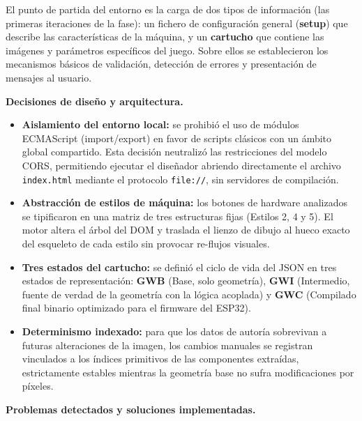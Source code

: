 El punto de partida del entorno es la carga de dos tipos de información
(las primeras iteraciones de la fase): un fichero de configuración
general (\textbf{setup}) que describe las características de la máquina,
y un \textbf{cartucho} que contiene las imágenes y parámetros
específicos del juego. Sobre ellos se establecieron los mecanismos
básicos de validación, detección de errores y presentación de mensajes
al usuario.

\textbf{Decisiones de diseño y arquitectura.}

\begin{itemize}
	\item \textbf{Aislamiento del entorno local:} se prohibió el uso de
	módulos ECMAScript (import/export) en favor de scripts clásicos con un
	ámbito global compartido. Esta decisión neutralizó las restricciones
	del modelo CORS, permitiendo ejecutar el diseñador abriendo
	directamente el archivo \texttt{index.html} mediante el protocolo
	\texttt{file://}, sin servidores de compilación.
	\item \textbf{Abstracción de estilos de máquina:} los botones de
	hardware analizados se tipificaron en una matriz de tres estructuras
	fijas (Estilos 2, 4 y 5). El motor altera el árbol del DOM y traslada
	el lienzo de dibujo al hueco exacto del esqueleto de cada estilo sin
	provocar re-flujos visuales.
	\item \textbf{Tres estados del cartucho:} se definió el ciclo de vida
	del JSON en tres estados de representación: \textbf{GWB} (Base, solo
	geometría), \textbf{GWI} (Intermedio, fuente de verdad de la geometría
	con la lógica acoplada) y \textbf{GWC} (Compilado final binario
	optimizado para el firmware del ESP32).
	\item \textbf{Determinismo indexado:} para que los datos de autoría
	sobrevivan a futuras alteraciones de la imagen, los cambios manuales
	se registran vinculados a los índices primitivos de las componentes
	extraídas, estrictamente estables mientras la geometría base no
	sufra modificaciones por píxeles.
\end{itemize}

\textbf{Problemas detectados y soluciones implementadas.}


